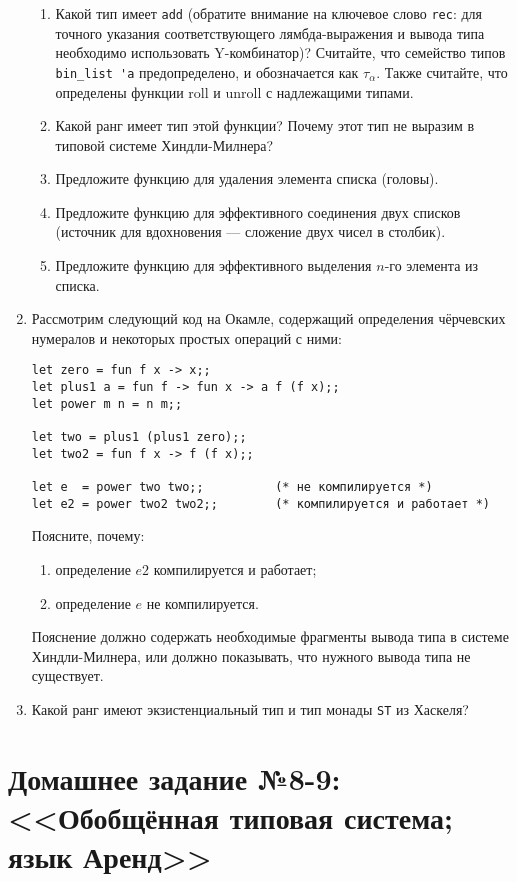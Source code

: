 \documentclass[10pt,a4paper,oneside]{article}
\begin{document}
\begin{enumerate}
\begin{enumerate}
\item Какой тип имеет \verb!add! (обратите внимание на ключевое слово \verb!rec!: для 
точного указания соответствующего лямбда-выражения и вывода типа необходимо использовать Y-комбинатор)?
Считайте, что семейство типов \verb!bin_list 'a! предопределено, и обозначается как $\tau_\alpha$.
Также считайте, что определены функции roll и unroll с надлежащими типами.
\item Какой ранг имеет тип этой функции? Почему этот тип не выразим в типовой системе Хиндли-Милнера?
\item Предложите функцию для удаления элемента списка (головы).
\item Предложите функцию для эффективного соединения двух списков (источник для 
вдохновения --- сложение двух чисел в столбик).
\item Предложите функцию для эффективного выделения $n$-го элемента из списка.
\end{enumerate}

\item Рассмотрим следующий код на Окамле, содержащий определения чёрчевских нумералов
и некоторых простых операций с ними:

\begin{verbatim}
let zero = fun f x -> x;;
let plus1 a = fun f -> fun x -> a f (f x);;
let power m n = n m;;

let two = plus1 (plus1 zero);;
let two2 = fun f x -> f (f x);;

let e  = power two two;;          (* не компилируется *)
let e2 = power two2 two2;;        (* компилируется и работает *)
\end{verbatim}

Поясните, почему:
\begin{enumerate}
\item определение $e2$ компилируется и работает;
\item определение $e$ не компилируется.
\end{enumerate}

Пояснение должно содержать необходимые фрагменты вывода типа в системе Хиндли-Милнера, 
или должно показывать, что нужного вывода типа не существует.

\item Какой ранг имеют экзистенциальный тип и тип монады \verb!ST! из Хаскеля?
\end{enumerate}

\section*{Домашнее задание №8-9: <<Обобщённая типовая система; язык Аренд>>}
\end{document}
